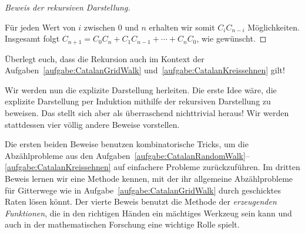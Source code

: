 \begin{proof}[Beweis der rekursiven Darstellung]
\begin{center}
	\end{center}
	Für jeden Wert von $i$ zwischen $0$ und $n$ erhalten wir somit $C_iC_{n-i}$ Möglichkeiten. Insgesamt folgt $C_{n+1}=C_0C_n+C_1C_{n-1}+\dotsb+C_{n}C_0$, wie gewünscht.
\end{proof}
\begin{aufgabe*}
	Überlegt euch, dass die Rekursion auch im Kontext der Aufgaben~\ref{aufgabe:CatalanGridWalk} und~\ref{aufgabe:CatalanKreissehnen} gilt!
\end{aufgabe*}
Wir werden nun die explizite Darstellung herleiten. Die erste Idee wäre, die explizite Darstellung per Induktion mithilfe der rekursiven Darstellung zu beweisen. Das stellt sich aber als überraschend nichttrivial heraus! Wir werden stattdessen vier völlig andere Beweise vorstellen.

Die ersten beiden Beweise benutzen kombinatorische Tricks, um die Abzählprobleme aus den Aufgaben~\ref{aufgabe:CatalanRandomWalk}--\ref{aufgabe:CatalanKreissehnen} auf einfachere Probleme zurückzuführen. Im dritten Beweis lernen wir eine Methode kennen, mit der ihr allgemeine Abzählprobleme für Gitterwege wie in Aufgabe~\ref{aufgabe:CatalanGridWalk} durch geschicktes Raten lösen könnt. Der vierte Beweis benutzt die Methode der \emph{erzeugenden Funktionen}, die in den richtigen Händen ein mächtiges Werkzeug sein kann und auch in der mathematischen Forschung eine wichtige Rolle spielt.

